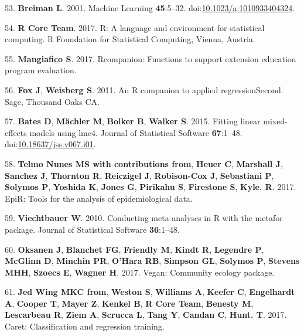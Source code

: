 \documentclass[12pt,]{article}
\begin{document}
\hypertarget{ref-Breiman2001}{}
53. \textbf{Breiman L}. 2001. Machine Learning \textbf{45}:5--32.
doi:\href{https://doi.org/10.1023/a:1010933404324}{10.1023/a:1010933404324}.

\hypertarget{ref-r_citation_2017}{}
54. \textbf{R Core Team}. 2017. R: A language and environment for
statistical computing. R Foundation for Statistical Computing, Vienna,
Austria.

\hypertarget{ref-rcompanion_citation_2017}{}
55. \textbf{Mangiafico S}. 2017. Rcompanion: Functions to support
extension education program evaluation.

\hypertarget{ref-car_citation_2011}{}
56. \textbf{Fox J}, \textbf{Weisberg S}. 2011. An R companion to applied
regressionSecond. Sage, Thousand Oaks CA.

\hypertarget{ref-lme4_citation_2015}{}
57. \textbf{Bates D}, \textbf{Mächler M}, \textbf{Bolker B},
\textbf{Walker S}. 2015. Fitting linear mixed-effects models using lme4.
Journal of Statistical Software \textbf{67}:1--48.
doi:\href{https://doi.org/10.18637/jss.v067.i01}{10.18637/jss.v067.i01}.

\hypertarget{ref-epir_citation_2017}{}
58. \textbf{Telmo Nunes MS with contributions from}, \textbf{Heuer C},
\textbf{Marshall J}, \textbf{Sanchez J}, \textbf{Thornton R},
\textbf{Reiczigel J}, \textbf{Robison-Cox J}, \textbf{Sebastiani P},
\textbf{Solymos P}, \textbf{Yoshida K}, \textbf{Jones G},
\textbf{Pirikahu S}, \textbf{Firestone S}, \textbf{Kyle. R}. 2017. EpiR:
Tools for the analysis of epidemiological data.

\hypertarget{ref-metafor_citation_2010}{}
59. \textbf{Viechtbauer W}. 2010. Conducting meta-analyses in R with the
metafor package. Journal of Statistical Software \textbf{36}:1--48.

\hypertarget{ref-vegan_citation_2017}{}
60. \textbf{Oksanen J}, \textbf{Blanchet FG}, \textbf{Friendly M},
\textbf{Kindt R}, \textbf{Legendre P}, \textbf{McGlinn D},
\textbf{Minchin PR}, \textbf{O'Hara RB}, \textbf{Simpson GL},
\textbf{Solymos P}, \textbf{Stevens MHH}, \textbf{Szoecs E},
\textbf{Wagner H}. 2017. Vegan: Community ecology package.

\hypertarget{ref-caret_citation_2017}{}
61. \textbf{Jed Wing MKC from}, \textbf{Weston S}, \textbf{Williams A},
\textbf{Keefer C}, \textbf{Engelhardt A}, \textbf{Cooper T},
\textbf{Mayer Z}, \textbf{Kenkel B}, \textbf{R Core Team},
\textbf{Benesty M}, \textbf{Lescarbeau R}, \textbf{Ziem A},
\textbf{Scrucca L}, \textbf{Tang Y}, \textbf{Candan C}, \textbf{Hunt.
T}. 2017. Caret: Classification and regression training.
\end{document}
